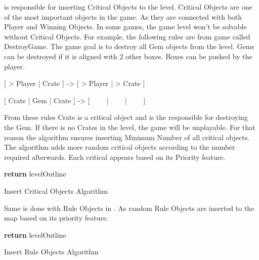  is responsible for inserting Critical Objects to the level. Critical Objects are one of the most important objects in the game. As they are connected with both Player and Winning Objects. In some games, the game level won't be solvable without Critical Objects. For example, the following rules are from game called DestroyGame. The game goal is to destroy all Gem objects from the level. Gems can be destroyed if it is aligned with 2 other boxes. Boxes can be pushed by the player.
\begin{center} [ > Player | Crate ] -> [ > Player | > Crate ]\end{center}
\begin{center} [ Crate | Gem | Crate ] -> [ \ \ \ \ | \ \ \ \ | \ \ \ \ ]\end{center}
From these rules Crate is a critical object and is the responsible for destroying the Gem. If there is no Crates in the level, the game will be unplayable. For that reason the algorithm ensures inserting Minimum Number of all critical objects. The algorithm adds more random critical objects according to the number required afterwards. Each critical appears based on its Priority feature.\\

\begin{algorithm}[H]
	\BlankLine
	\BlankLine
	\BlankLine
	\textbf{return} levelOutline\;
	\caption{Insert Critical Objects Algorithm}
	\label{Algorithm:criticalObjects}
\end{algorithm}

Same is done with Rule Objects in . As random Rule Objects are inserted to the map based on its priority feature.\\

\begin{algorithm}[H]
	\BlankLine
	\BlankLine
	\textbf{return} levelOutline\;
	\caption{Insert Rule Objects Algorithm}
	\label{Algorithm:ruleObjects}
\end{algorithm}

